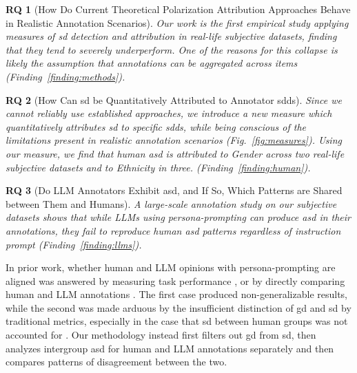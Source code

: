 \documentclass[manuscript,screen,review,anonymous]{acmart}
\theoremstyle{acmplain}
\theoremstyle{researchquestionstyle}
\newtheorem{researchquestion}{RQ}
\begin{document}
\begin{researchquestion}[How Do Current Theoretical Polarization Attribution Approaches Behave in Realistic Annotation Scenarios]
	Our work is the first empirical study applying measures of \ac{sd} detection and attribution in real-life subjective datasets, finding that they tend to severely underperform. One of the reasons for this collapse is likely the assumption that annotations can be aggregated across items \citep{akhtar_2019, pavlopoulos-likas-2024, checco_2017} (Finding~\ref{finding:methods}).
\end{researchquestion}

\begin{researchquestion}[How Can \ac{sd} be Quantitatively Attributed to Annotator \acp{sdd}]
	\label{rq:measure}
	Since we cannot reliably use established approaches, we introduce a new measure which \emph{quantitatively} attributes \ac{sd} to specific \acp{sdd}, while being conscious of the limitations present in realistic annotation scenarios (Fig.~\ref{fig:measures}). Using our measure, we find that human \ac{asd} is attributed to \emph{Gender} across two real-life subjective datasets and to \emph{Ethnicity} in three.
 (Finding~\ref{finding:human}). 
\end{researchquestion}

\begin{researchquestion}[Do LLM Annotators Exhibit \ac{asd}, and If So, Which Patterns are Shared between Them and Humans]
	\label{rq:llm}
	A large-scale annotation study on our subjective datasets shows that while LLMs using persona-prompting \emph{can} produce \ac{asd} in their annotations, they fail to reproduce human \ac{asd} patterns regardless of instruction prompt (Finding~\ref{finding:llms}).
\end{researchquestion}

In prior work, whether human and LLM opinions with persona-prompting are aligned was answered by measuring task performance \citep{gupta2024bias}, or by directly comparing human and LLM annotations \citep{dong-etal-2024-llm, gomez-etal-2024-algorithmic, masud-etal-2024-hate}. The first case produced non-generalizable results, while the second was made arduous by the insufficient distinction of \ac{gd} and \ac{sd} by traditional metrics, especially in the case that \ac{sd} between human groups was not accounted for \citep{Feinstein1990, Byrt1993, van_der_Velden, checco_2017}. Our methodology instead first filters out \ac{gd} from \ac{sd}, then analyzes intergroup \ac{asd} for human and LLM annotations separately and then compares patterns of disagreement between the two. 
\end{document}
